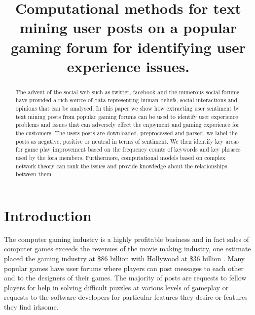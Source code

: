 \documentclass{ewic}
\begin{document}

\title{Computational methods for text mining user posts on a popular gaming forum for identifying user experience issues.}





\begin{abstract}
The advent of the social web such as twitter, facebook and the numerous social forums have provided a rich source of data representing human beliefs, social interactions and opinions that can be analysed. In this paper we show how extracting user sentiment by text mining posts from popular gaming forums can be used to identify user experience problems and issues that can adversely effect the enjoyment and gaming experience for the customers. The users posts are downloaded, preprocessed and parsed, we label the posts as negative, positive or neutral in terms of sentiment. We then identify key areas for game play improvement based on the frequency counts of keywords and key phrases used by the fora members. Furthermore, computational models based on complex network theory can rank the issues and provide knowledge about the relationships between them.
\end{abstract}


\maketitle

\section{Introduction}
The computer gaming industry is a highly profitable business and in fact sales of computer games exceeds the revenues of the movie making industry, one estimate placed the gaming industry at \$86 billion with Hollywood at \$36 billion \cite{UKIE2016}.  Many popular games have user forums where players can post messages to each other and to the designers of their games. The majority of posts are requests to fellow players for help in solving difficult puzzles at various levels of gameplay or requests to the software developers for particular features they desire or features they find irksome. 
\end{document}
